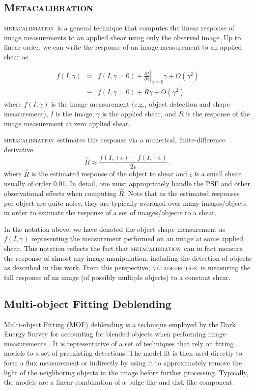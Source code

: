 \documentclass[fleqn,useAMS,usenatbib]{mnras}
\newcommand{\mcal}{\textsc{metacalibration}}
\newcommand{\mdet}{\textsc{metadetection}}
\begin{document}
\subsection{\textsc{Metacalibration}}

\mcal\ is a general technique that computes the linear response of image measurements
to an applied shear using only the observed image. Up to linear order, we can
write the response of an image measurement to an applied shear as

\begin{eqnarray}
f(I, \gamma) & \approx & f(I, \gamma=0) + \left.\frac{\partial f}{\partial\gamma}\right|_{\gamma=0} \gamma + O(\gamma^2)\nonumber\\
&\equiv& f(I, \gamma=0) + R \gamma + O(\gamma^2)
\end{eqnarray}
where $f(I,\gamma)$ is the image measurement (e.g., object detection and shape
measurement), $I$ is the image, $\gamma$ is the applied shear, and $R$ is the response of the
image measurement at zero applied shear.

\mcal\ estimates this response via a
numerical, finite-difference derivative
\begin{displaymath}
  \hat{R} \approx \frac{f(I, +\epsilon) - f(I, -\epsilon)}{2\epsilon}\ .
\end{displaymath}
where $\hat{R}$ is the estimated response of the object to shear
and $\epsilon$ is a small shear, usually of order 0.01. In detail, one must
appropriately handle the PSF and other observational effects when computing
$\hat R$. Note that as the estimated responses per-object are quite noisy,
they are typically averaged over many images/objects in order to estimate
the response of a set of images/objects to a shear.

In the notation above, we have denoted the object shape measurement as
$f(I, \gamma)$ representing the measurement performed on an image at some applied
shear. This notation reflects the fact that \mcal\ can in fact measure the response
of almost any image manipulation, including the detection of objects as described
in this work. From this perspective, \mdet\ is measuring the full response of
an image (of possibly multiple objects) to a constant shear.

\subsection{Multi-object Fitting Deblending}

Multi-object Fitting (MOF) deblending is a technique employed by the Dark
Energy Survey for accounting for blended objects when performing image
measurements \citep{DESY1cat}. It is representative of a set of techniques that
rely on fitting models to a set of preexisting detections. The model fit is
then used directly to form a flux measurement or indirectly by using it to
approximately remove the light of the neighboring objects in the image
before further processing. Typically, the models are a linear combination
of a bulge-like and disk-like component.
\end{document}
